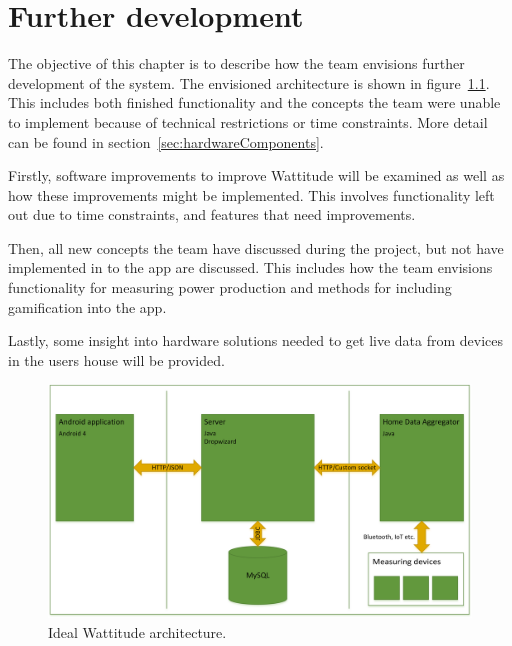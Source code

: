 \chapter{Further development}
\label{sec:further}
The objective of this chapter is to describe how the team envisions further development of the system. The envisioned architecture is shown in figure~\ref{fig:idealArchitecture}. This includes both finished functionality and the concepts the team were unable to implement because of technical restrictions or time constraints. More detail can be found in section~\ref{sec:hardwareComponents}.

Firstly, software improvements to improve Wattitude will be examined as well as how these improvements might be implemented. This involves functionality left out due to time constraints, and features that need improvements. 

Then, all new concepts the team have discussed during the project, but not have implemented in to the app are discussed. This includes how the team envisions functionality for measuring power production and methods for including gamification into the app. 

Lastly, some insight into hardware solutions needed to get live data from devices in the users house will be provided. 

\begin{figure}[H]
\centering
\includegraphics[height=0.3\textheight]{ch/further/fig/architecture.png}
\caption{Ideal Wattitude architecture.}
\label{fig:idealArchitecture}
\end{figure}




